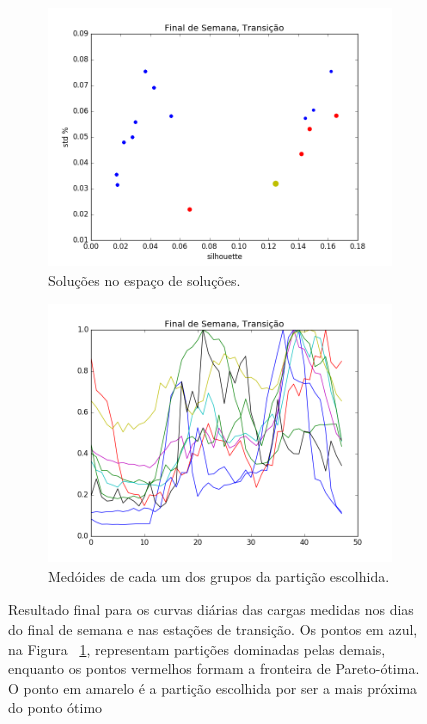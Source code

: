 \begin{figure}[!h]
	\centering
	\begin{subfigure}{.5\textwidth}
		\centering
		\includegraphics[width=.9\linewidth]{figuras/australia_5000/pareto_Final_de_Semana_Transicao.png}
		\caption{Soluções no espaço de soluções.}
		\label{fig:pareto_FDS_transicao}
	\end{subfigure}%
	\begin{subfigure}{.5\textwidth}
		\centering
		\includegraphics[width=.9\linewidth]{figuras/australia_5000/Final_de_Semana_Transicao.png}
		\caption{Medóides de cada um dos grupos da partição escolhida.}
		\label{fig:FDS_transicao}
	\end{subfigure}
	\caption{Resultado final para os curvas diárias das cargas medidas nos dias do final de semana e nas estações de transição. Os pontos em azul, na Figura ~\ref{fig:pareto_FDS_transicao}, representam partições dominadas pelas demais, enquanto os pontos vermelhos formam a fronteira de Pareto-ótima. O ponto em amarelo é a partição escolhida por ser a mais próxima do ponto ótimo}
	\label{fig:FDS_transicao_}
\end{figure}

